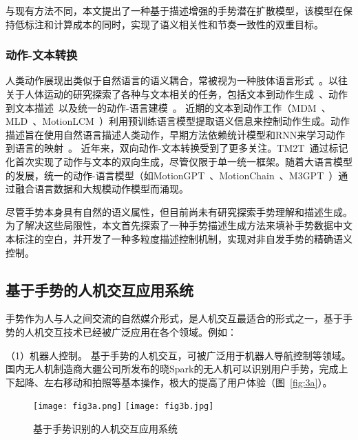 与现有方法不同，本文提出了一种基于描述增强的手势潜在扩散模型，该模型在保持低标注和计算成本的同时，实现了语义相关性和节奏一致性的双重目标。

\subsubsection{动作-文本转换}
人类动作展现出类似于自然语言的语义耦合，常被视为一种肢体语言形式~\cite{jiang2024motiongpt}。以往关于人体运动的研究探索了各种与文本相关的任务，包括文本到动作生成~\cite{tevet2022mdm,guo2022humanml3d}、动作到文本描述~\cite{jiang2024motiongpt,guo2022tm2t}以及统一的动作-语言建模~\cite{tevet2022motionclip,jiang2024motiongpt,jiang2024motionchain}。
近期的文本到动作工作（MDM~\cite{tevet2022mdm}、MLD~\cite{chen2023executing}、MotionLCM~\cite{dai2024motionlcm}）利用预训练语言模型提取语义信息来控制动作生成。动作描述旨在使用自然语言描述人类动作，早期方法依赖统计模型和RNN来学习动作到语言的映射~\cite{takano2015statistical, yamada2018paired}。
近年来，双向动作-文本转换受到了更多关注。TM2T~\cite{guo2022tm2t}通过标记化首次实现了动作与文本的双向生成，尽管仅限于单一统一框架。随着大语言模型的发展，统一的动作-语言模型（如MotionGPT~\cite{jiang2024motiongpt}、MotionChain~\cite{jiang2024motionchain}、M3GPT~\cite{luo2024m}）通过融合语言数据和大规模动作模型而涌现。

尽管手势本身具有自然的语义属性，但目前尚未有研究探索手势理解和描述生成。
为了解决这些局限性，本文首先探索了一种手势描述生成方法来填补手势数据中文本标注的空白，并开发了一种多粒度描述控制机制，实现对非自发手势的精确语义控制。



\subsection{基于手势的人机交互应用系统}
手势作为人与人之间交流的自然媒介形式，是人机交互最适合的形式之一\cite{oudah2020hand}，基于手势的人机交互技术已经被广泛应用在各个领域。例如：

（1）机器人控制。 基于手势的人机交互，可被广泛用于机器人导航控制等领域\cite{al20223d}。国内无人机制造商大疆公司所发布的晓Spark的无人机可以识别用户手势，完成上下起降、左右移动和拍照等基本操作，极大的提高了用户体验（图~\ref{fig:3a}）。

\begin{figure}
  \centering
    {\texttt{[image: fig3a.png]}}
    {\texttt{[image: fig3b.jpg]}}
  \caption{基于手势识别的人机交互应用系统}
  \label{fig:HCI_system}
\end{figure}


